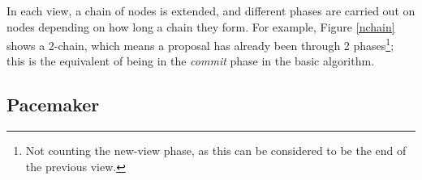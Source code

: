 In each view, a chain of nodes is extended, and different phases are carried out on nodes depending on how long a chain they form. For example, Figure \ref{nchain} shows a 2-chain, which means a proposal has already been through 2 phases\footnote{Not counting the new-view phase, as this can be considered to be the end of the previous view.}; this is the equivalent of being in the \textit{commit} phase in the basic algorithm.


\subsection{Pacemaker} \label{pacemaker}

